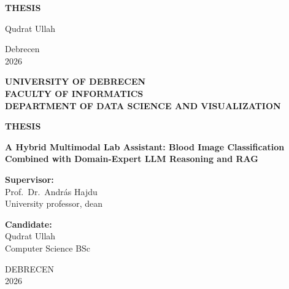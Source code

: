 \documentclass[12pt,a4paper]{article}
\begin{document}
\begin{titlepage}
\centering
\vspace*{5cm}
{\fontsize{16}{19}\selectfont\bfseries THESIS\par}
\vspace{7cm}
\hfill{\fontsize{14}{17}\selectfont Qudrat Ullah}\par
\vfill
{\fontsize{14}{17}\selectfont Debrecen\\[2pt]2026\par}
\end{titlepage}

\begin{titlepage}
\centering
{\fontsize{14}{17}\selectfont\bfseries UNIVERSITY OF DEBRECEN\\[2pt]FACULTY OF INFORMATICS\\[2pt]DEPARTMENT OF DATA SCIENCE AND VISUALIZATION\par}
\vspace{3cm}
{\fontsize{16}{19}\selectfont\bfseries THESIS\par}
\vspace{1cm}
{\fontsize{16}{20}\selectfont\bfseries A Hybrid Multimodal Lab Assistant: Blood Image Classification Combined with Domain-Expert LLM Reasoning and RAG\par}
\vfill
\begin{minipage}[t]{0.48\textwidth}
\raggedright
\textbf{Supervisor:}\\
Prof.\ Dr.\ András Hajdu\\
University professor, dean
\end{minipage}\hfill
\begin{minipage}[t]{0.48\textwidth}
\raggedleft
\textbf{Candidate:}\\
Qudrat Ullah\\
Computer Science BSc
\end{minipage}
\vspace{3cm}

{\fontsize{14}{17}\selectfont DEBRECEN\\[2pt]2026\par}
\end{titlepage}

\setcounter{page}{1}
\tableofcontents
\clearpage
\end{document}
